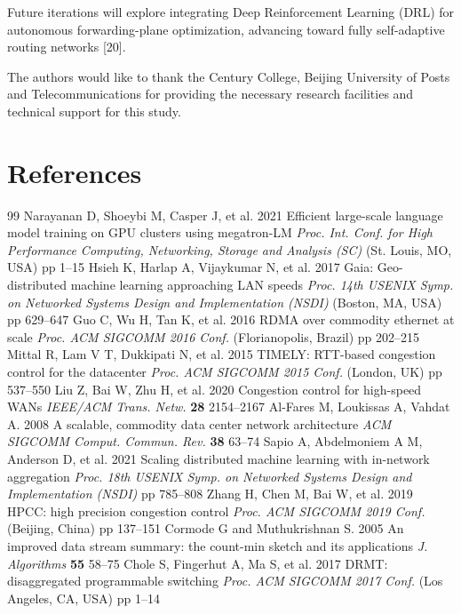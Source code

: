 \documentclass[a4paper]{jpconf}
\begin{document}
Future iterations will explore integrating Deep Reinforcement Learning (DRL) for autonomous forwarding-plane optimization, advancing toward fully self-adaptive routing networks [20].


\ack

The authors would like to thank the Century College, Beijing University of Posts and Telecommunications for providing the necessary research facilities and technical support for this study.


\section*{References}
\begin{thebibliography}{99}
 Narayanan D, Shoeybi M, Casper J, et al. 2021 Efficient large-scale language model training on GPU clusters using megatron-LM \textit{Proc. Int. Conf. for High Performance Computing, Networking, Storage and Analysis (SC)} (St. Louis, MO, USA) pp 1--15
 Hsieh K, Harlap A, Vijaykumar N, et al. 2017 Gaia: Geo-distributed machine learning approaching LAN speeds \textit{Proc. 14th USENIX Symp. on Networked Systems Design and Implementation (NSDI)} (Boston, MA, USA) pp 629--647
 Guo C, Wu H, Tan K, et al. 2016 RDMA over commodity ethernet at scale \textit{Proc. ACM SIGCOMM 2016 Conf.} (Florianopolis, Brazil) pp 202--215
 Mittal R, Lam V T, Dukkipati N, et al. 2015 TIMELY: RTT-based congestion control for the datacenter \textit{Proc. ACM SIGCOMM 2015 Conf.} (London, UK) pp 537--550
 Liu Z, Bai W, Zhu H, et al. 2020 Congestion control for high-speed WANs \textit{IEEE/ACM Trans. Netw.} \textbf{28} 2154--2167
 Al-Fares M, Loukissas A, Vahdat A. 2008 A scalable, commodity data center network architecture \textit{ACM SIGCOMM Comput. Commun. Rev.} \textbf{38} 63--74
 Sapio A, Abdelmoniem A M, Anderson D, et al. 2021 Scaling distributed machine learning with in-network aggregation \textit{Proc. 18th USENIX Symp. on Networked Systems Design and Implementation (NSDI)} pp 785--808
 Zhang H, Chen M, Bai W, et al. 2019 HPCC: high precision congestion control \textit{Proc. ACM SIGCOMM 2019 Conf.} (Beijing, China) pp 137--151
 Cormode G and Muthukrishnan S. 2005 An improved data stream summary: the count-min sketch and its applications \textit{J. Algorithms} \textbf{55} 58--75
 Chole S, Fingerhut A, Ma S, et al. 2017 DRMT: disaggregated programmable switching \textit{Proc. ACM SIGCOMM 2017 Conf.} (Los Angeles, CA, USA) pp 1--14

\end{thebibliography}
\end{document}
